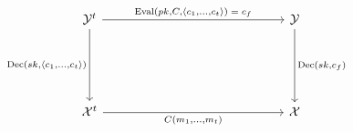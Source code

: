 \[
\begin{tikzcd}[row sep=2cm, column sep=5cm]
\mathcal{Y}^t \arrow{r}{\text{Eval}(pk,C,\left\langle c_1, \dots, c_t \right\rangle) \; = \; c_f} \arrow{d}[swap]{\text{Dec}(sk, \left \langle c_1, \dots, c_t \right\rangle)} & \mathcal{Y} \arrow{d}{\text{Dec}(sk, c_f)} \\
\mathcal{X}^t \arrow{r}[swap]{C(m_1, \dots, m_t)} & \mathcal{X}
\end{tikzcd}
\]
